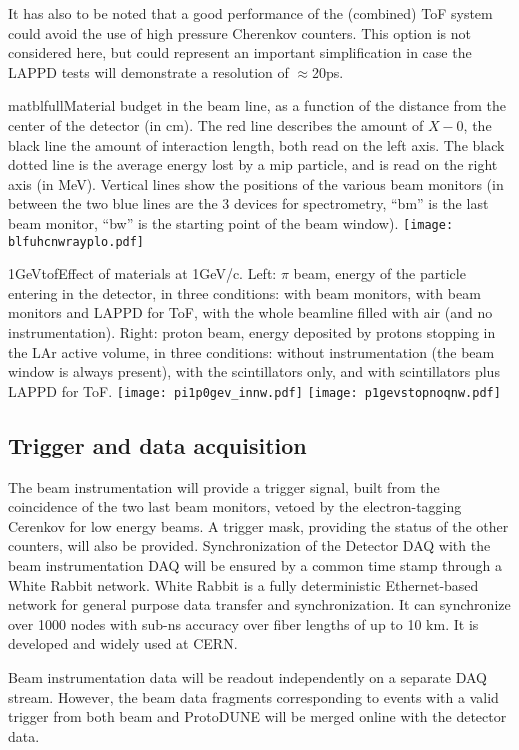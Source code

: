 It has also to be noted that a good performance of the (combined) ToF system could avoid the use of high pressure  Cherenkov counters. This option is not considered here, but could
represent an important simplification  in case the LAPPD tests will demonstrate a resolution of $\approx$20ps.
 \begin{cdrfigure}{matblfull}{Material budget in the beam line, as a function of the distance from the center of the detector (in cm). The red line describes the amount of $X-0$, the black line the amount of interaction length, both read on the left axis. The black dotted line is the average energy lost by a mip particle, and is read on the right axis (in MeV). Vertical lines show the positions of the various beam monitors (in between the two blue lines are the 3 devices for spectrometry, ``bm'' is the last beam monitor, ``bw'' is the starting point of the beam window).}  
\texttt{[image: blfuhcnwrayplo.pdf]}
\end{cdrfigure}
%
 \begin{cdrfigure}{1GeVtof}{Effect of materials at  1GeV/c. Left: $\pi$ beam, energy of the particle entering in the detector, in three conditions: with  beam monitors, with beam monitors and LAPPD for ToF, with the whole beamline filled with air (and no instrumentation). Right: proton beam, energy deposited by protons stopping in the LAr active volume, in three conditions: without instrumentation (the beam window is always present), with the scintillators only, and with scintillators plus LAPPD for ToF.}
\texttt{[image: pi1p0gev\_innw.pdf]}
\texttt{[image: p1gevstopnoqnw.pdf]}
\end{cdrfigure}



\subsection {Trigger and data acquisition}
The beam instrumentation will provide a trigger signal, built from the coincidence of the two last beam monitors, vetoed by the electron-tagging Cerenkov for low energy beams. A trigger mask, providing the status of the other counters, will also be provided. 
 Synchronization of the Detector DAQ with the beam instrumentation DAQ will be ensured by a common time stamp through a White Rabbit network.
 White Rabbit is a fully deterministic Ethernet-based network for general purpose data transfer and synchronization. It can synchronize over 1000 nodes with sub-ns accuracy over fiber lengths of up to 10 km. It is developed and widely used at CERN.

Beam instrumentation data will be readout independently on a separate DAQ stream. However,  
the beam data fragments corresponding to  events with a valid trigger from both beam and ProtoDUNE will be merged online with the detector data.
 

